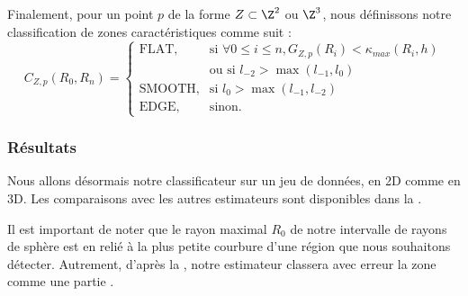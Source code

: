 Finalement, pour un point $p$ de la forme $Z \subset \Z^2$ ou $\Z^3$, nous définissons notre classification de zones caractéristiques comme suit :
\begin{equation}
 C_{Z,p}(R_0, R_n) =
  \begin{cases}
      \text{FLAT},         & \text{si } \forall 0 \leq i \leq n,    G_{Z,p}(R_i) < \kappa_{max}(R_i,h) \\
                           & \text{ou si } l_{-2} > \max( l_{-1}, l_{0} )\\
      \text{SMOOTH},       & \text{si } l_{0}> \max( l_{-1}, l_{-2} )\\
      \text{EDGE},        & \text{sinon.}
  \end{cases}
\end{equation}

\subsubsection{Résultats}
\label{sec:applications:feature:II:results}

Nous allons désormais notre classificateur sur un jeu de données, en 2D comme en 3D.
Les comparaisons avec les autres estimateurs sont disponibles dans la .

Il est important de noter que le rayon maximal $R_0$ de notre intervalle de
rayons de sphère est en relié à la plus petite courbure d'une région \featsmooth
que nous souhaitons détecter. Autrement, d'après la ,
notre estimateur classera avec erreur la zone comme une partie \featflat.

